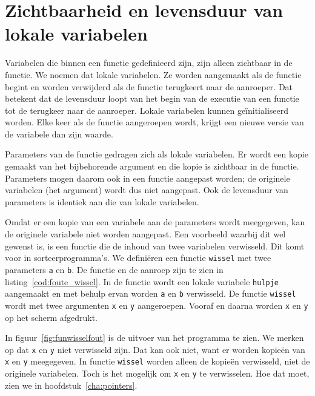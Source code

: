 \section{Zichtbaarheid en levensduur van lokale variabelen}
Variabelen die binnen een functie gedefinieerd zijn, zijn alleen zichtbaar in de functie. We noemen dat lokale variabelen. Ze worden aangemaakt als de functie begint en worden verwijderd als de functie terugkeert naar de aanroeper. Dat betekent dat de levensduur loopt van het begin van de executie van een functie tot de terugkeer naar de aanroeper. Lokale variabelen kunnen geïnitialiseerd worden. Elke keer als de functie aangeroepen wordt, krijgt een nieuwe versie van de variabele dan zijn waarde.

Parameters van de functie gedragen zich als lokale variabelen. Er wordt een kopie gemaakt van het bijbehorende argument en die kopie is zichtbaar in de functie. Parameters mogen daarom ook in een functie aangepast worden; de originele variabelen (het argument) wordt dus niet aangepast. Ook de levensduur van parameters is identiek aan die van lokale variabelen.

Omdat er een kopie van een variabele aan de parameters wordt meegegeven, kan de originele variabele niet worden aangepast. Een voorbeeld waarbij dit wel gewenst is, is een functie die de inhoud van twee variabelen verwisseld. Dit komt voor in sorteerprogramma's. We definiëren een functie \texttt{wissel} met twee parameters \texttt{a} en \texttt{b}. De functie en de aanroep zijn te zien in listing~\ref{cod:foute_wissel}. In de functie wordt een lokale variabele \texttt{hulpje} aangemaakt en met behulp ervan worden \texttt{a} en \texttt{b} verwisseld. De functie \texttt{wissel} wordt met twee argumenten \texttt{x} en \texttt{y} aangeroepen. Vooraf en daarna worden \texttt{x} en \texttt{y} op het scherm afgedrukt.


In figuur~\ref{fig:funwisselfout} is de uitvoer van het programma te zien. We merken op dat \texttt{x} en \texttt{y} niet verwisseld zijn. Dat kan ook niet, want er worden kopieën van \texttt{x} en \texttt{y} meegegeven. In functie \texttt{wissel} worden alleen de kopieën verwisseld, niet de originele variabelen.
Toch is het mogelijk om \texttt{x} en \texttt{y} te verwisselen. Hoe dat moet, zien we in hoofdstuk~\ref{cha:pointers}.

